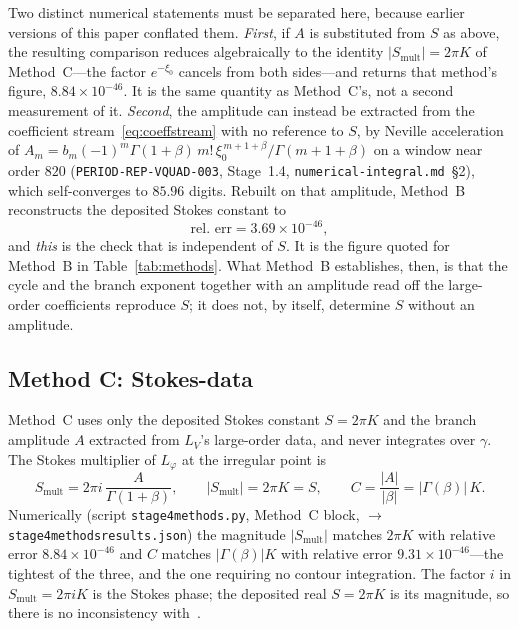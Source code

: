 \documentclass[11pt,reqno]{amsart}
\renewcommand{\_}{\vquadorigunderscore\allowbreak}
\theoremstyle{plain}
\theoremstyle{definition}
\newcommand{\Lphi}{L_{\varphi}}
\newcommand{\LV}{L_{V}}
\newcommand{\xizero}{\xi_0}
\providecommand{\C}{}\renewcommand{\C}{C}
\begin{document}
Two distinct numerical statements must be separated here, because earlier versions of this paper
conflated them. \emph{First}, if $A$ is substituted from $S$ as above, the resulting comparison
reduces algebraically to the identity $\lvert S_{\mathrm{mult}}\rvert=2\pi K$ of
Method~C---the factor $e^{-\xizero}$ cancels from both sides---and returns that method's figure,
$8.84\times10^{-46}$. It is the same quantity as Method~C's, not a second measurement of it.
\emph{Second}, the amplitude can instead be extracted from the coefficient
stream~\eqref{eq:coeffstream} with no reference to $S$, by Neville acceleration of
$A_m=b_m(-1)^m\Gamma(1+\beta)\,m!\,\xizero^{\,m+1+\beta}/\Gamma(m+1+\beta)$ on a window near order
$820$ (\texttt{PERIOD-REP-VQUAD-003}, Stage~1.4, \texttt{numerical-integral.md}~\S2), which
self-converges to $85.96$ digits. Rebuilt on that amplitude, Method~B reconstructs the deposited
Stokes constant to
\begin{equation}\label{eq:methodB-err}
  \text{rel.\ err}=3.69\times10^{-46},
\end{equation}
and \emph{this} is the check that is independent of $S$. It is the figure quoted for Method~B in
Table~\ref{tab:methods}. What Method~B establishes, then, is that the cycle and the branch
exponent together with an amplitude read off the large-order coefficients reproduce $S$; it does
not, by itself, determine $S$ without an amplitude.

\subsection{Method C: Stokes-data}\label{sub:methodC}
Method~C uses only the deposited Stokes constant $S=2\pi K$ and the branch amplitude $A$ extracted
from $\LV$'s large-order data, and never integrates over $\gamma$. The Stokes multiplier of
$\Lphi$ at the irregular point is
\begin{equation}\label{eq:methodC}
  S_{\mathrm{mult}}=2\pi i\,\frac{A}{\Gamma(1+\beta)},\qquad
  \lvert S_{\mathrm{mult}}\rvert=2\pi K=S,\qquad
  \C=\frac{\lvert A\rvert}{\lvert\beta\rvert}=\lvert\Gamma(\beta)\rvert\,K .
\end{equation}
Numerically (script \texttt{stage4\_methods.py}, Method~C block, $\to$ \texttt{stage4\_methods\_results.json})
the magnitude $\lvert S_{\mathrm{mult}}\rvert$ matches $2\pi K$ with relative error
$8.84\times10^{-46}$ and $\C$ matches $\lvert\Gamma(\beta)\rvert K$ with relative error
$9.31\times10^{-46}$---the tightest of the three, and the one requiring no contour integration.
The factor $i$ in $S_{\mathrm{mult}}=2\pi iK$ is the Stokes phase; the deposited real
$S=2\pi K$ is its magnitude, so there is no inconsistency with~\cite{Vquad,StokesNote}.
\end{document}
